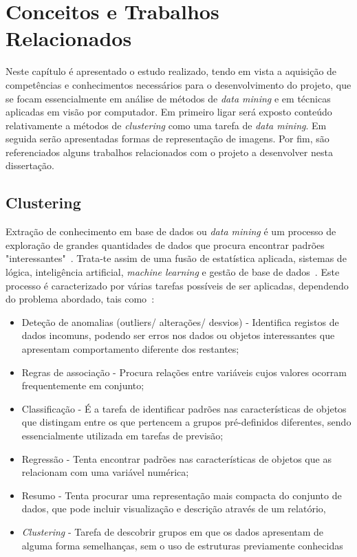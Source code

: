 
\chapter{Conceitos e Trabalhos Relacionados} \label{chap:estarte}

Neste capítulo é apresentado o estudo realizado, tendo em vista a aquisição de competências e conhecimentos necessários para o desenvolvimento do projeto, que se focam essencialmente em análise de métodos de \textit{data mining} e em técnicas aplicadas em visão por computador. Em primeiro ligar será exposto conteúdo relativamente a métodos de \textit{clustering} como uma tarefa de \textit{data mining}. Em seguida serão apresentadas formas de representação de imagens. Por fim, são referenciados alguns trabalhos relacionados com o projeto a desenvolver nesta dissertação.

\section{Clustering} \label{sec:cluster}

Extração de conhecimento em base de dados ou \textit{data mining} é um processo de exploração de grandes quantidades de dados que procura encontrar padrões "interessantes"~\citet{Han2006}. Trata-te assim de uma fusão de estatística aplicada, sistemas de lógica, inteligência artificial, \textit{machine learning} e gestão de base de dados~\citet{North2012}. Este processo é caracterizado por várias tarefas possíveis de ser aplicadas, dependendo do problema abordado, tais como~\citep{Fayyad1996}:

\begin{itemize}
\item Deteção de anomalias (outliers/ alterações/ desvios) - Identifica registos de dados incomuns, podendo ser erros nos dados ou objetos interessantes que apresentam comportamento diferente dos restantes;
\item Regras de associação - Procura relações entre variáveis cujos valores ocorram frequentemente em conjunto;
\item Classificação - É a tarefa de identificar padrões nas características de objetos que distingam entre os que pertencem a grupos pré-definidos diferentes, sendo essencialmente utilizada em tarefas de previsão;
\item Regressão - Tenta encontrar padrões nas características de objetos que as relacionam com uma variável numérica;
\item Resumo - Tenta procurar uma representação mais compacta do conjunto de dados, que pode incluir visualização e descrição através de um relatório,
\item \textit{Clustering} - Tarefa de descobrir grupos em que os dados apresentam de alguma forma semelhanças, sem o uso de estruturas previamente conhecidas
\end{itemize}

